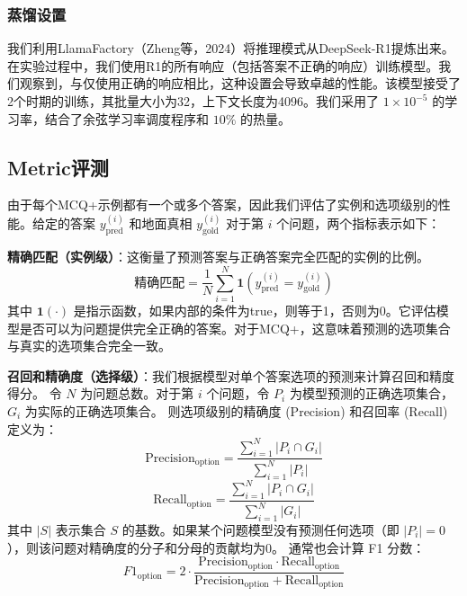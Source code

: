 \documentclass{pkuthesis}
\begin{document}
\subsubsection{蒸馏设置}
我们利用LlamaFactory（Zheng等，2024）将推理模式从DeepSeek-R1提炼出来。在实验过程中，我们使用R1的所有响应（包括答案不正确的响应）训练模型。我们观察到，与仅使用正确的响应相比，这种设置会导致卓越的性能。该模型接受了2个时期的训练，其批量大小为32，上下文长度为4096。我们采用了 $1 \times 10^{-5}$ 的学习率，结合了余弦学习率调度程序和 $10\%$ 的热量。

\subsection{Metric评测}
由于每个MCQ+示例都有一个或多个答案，因此我们评估了实例和选项级别的性能。给定的答案 $y^{(i)}_{\text{pred}}$ 和地面真相 $y^{(i)}_{\text{gold}}$ 对于第 $i$ 个问题，两个指标表示如下：

\textbf{精确匹配（实例级）}：这衡量了预测答案与正确答案完全匹配的实例的比例。
$$ \text{精确匹配} = \frac{1}{N} \sum_{i=1}^{N} \mathbf{1}(y^{(i)}_{\text{pred}} = y^{(i)}_{\text{gold}}) $$
其中 $\mathbf{1}(\cdot)$ 是指示函数，如果内部的条件为true，则等于1，否则为0。它评估模型是否可以为问题提供完全正确的答案。对于MCQ+，这意味着预测的选项集合与真实的选项集合完全一致。

\textbf{召回和精确度（选择级）}：我们根据模型对单个答案选项的预测来计算召回和精度得分。
令 $N$ 为问题总数。对于第 $i$ 个问题，令 $P_i$ 为模型预测的正确选项集合，$G_i$ 为实际的正确选项集合。
则选项级别的精确度 (Precision) 和召回率 (Recall) 定义为：
$$ \text{Precision}_{\text{option}} = \frac{\sum_{i=1}^N |P_i \cap G_i|}{\sum_{i=1}^N |P_i|} $$
$$ \text{Recall}_{\text{option}} = \frac{\sum_{i=1}^N |P_i \cap G_i|}{\sum_{i=1}^N |G_i|} $$
其中 $|S|$ 表示集合 $S$ 的基数。如果某个问题模型没有预测任何选项（即 $|P_i|=0$），则该问题对精确度的分子和分母的贡献均为0。
通常也会计算 F1 分数：
$$ F1_{\text{option}} = 2 \cdot \frac{\text{Precision}_{\text{option}} \cdot \text{Recall}_{\text{option}}}{\text{Precision}_{\text{option}} + \text{Recall}_{\text{option}}} $$
\end{document}
